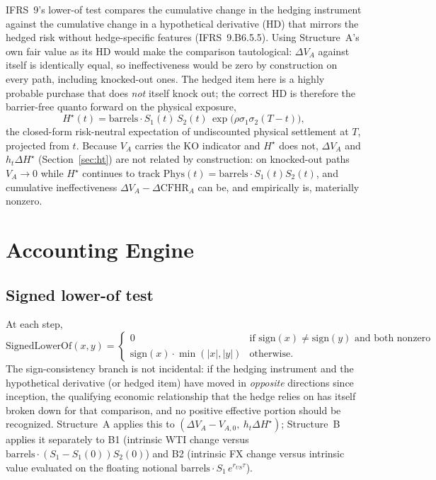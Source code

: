 \documentclass[11pt,a4paper]{article}
\begin{document}
IFRS~9's lower-of test compares the cumulative change in the hedging instrument against the cumulative change in a hypothetical derivative (HD) that mirrors the hedged risk without hedge-specific features (IFRS~9.B6.5.5). Using Structure~A's own fair value as its HD would make the comparison tautological: $\Delta V_A$ against itself is identically equal, so ineffectiveness would be zero by construction on every path, including knocked-out ones. The hedged item here is a highly probable purchase that does \emph{not} itself knock out; the correct HD is therefore the barrier-free quanto forward on the physical exposure,
\begin{equation}
\label{eq:hstar}
H^\star(t) = \mathrm{barrels}\cdot S_1(t)\,S_2(t)\,\exp\big(\rho\sigma_1\sigma_2(T-t)\big),
\end{equation}
the closed-form risk-neutral expectation of undiscounted physical settlement at $T$, projected from $t$. Because $V_A$ carries the KO indicator and $H^\star$ does not, $\Delta V_A$ and $h_t\Delta H^\star$ (Section~\ref{sec:ht}) are not related by construction: on knocked-out paths $V_A\to 0$ while $H^\star$ continues to track $\mathrm{Phys}(t)=\mathrm{barrels}\cdot S_1(t)S_2(t)$, and cumulative ineffectiveness $\Delta V_A-\Delta\mathrm{CFHR}_A$ can be, and empirically is, materially nonzero.

\section{Accounting Engine}
\label{sec:engine}

\subsection{Signed lower-of test}
\label{sec:lowerof}

At each step,
\begin{equation}
\mathrm{SignedLowerOf}(x,y) = \begin{cases} 0 & \text{if } \mathrm{sign}(x)\ne\mathrm{sign}(y) \text{ and both nonzero} \\ \mathrm{sign}(x)\cdot\min(|x|,|y|) & \text{otherwise.} \end{cases}
\end{equation}
The sign-consistency branch is not incidental: if the hedging instrument and the hypothetical derivative (or hedged item) have moved in \emph{opposite} directions since inception, the qualifying economic relationship that the hedge relies on has itself broken down for that comparison, and no positive effective portion should be recognized. Structure~A applies this to $(\Delta V_A-V_{A,0},\ h_t\Delta H^\star)$; Structure~B applies it separately to B1 (intrinsic WTI change versus $\mathrm{barrels}\cdot(S_1-S_1(0))S_2(0)$) and B2 (intrinsic FX change versus intrinsic value evaluated on the floating notional $\mathrm{barrels}\cdot S_1\,e^{r_{US}\tau}$).
\end{document}
